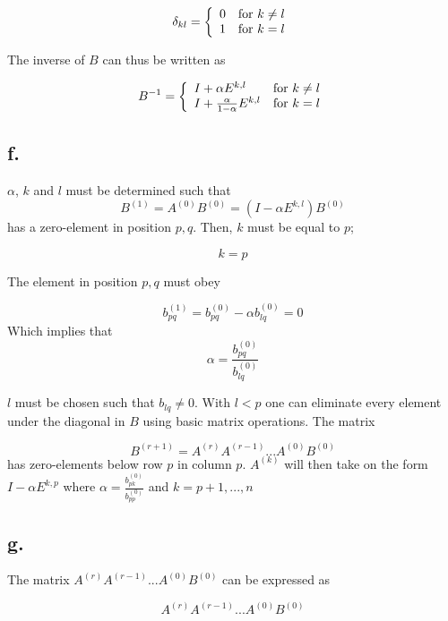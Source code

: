 \documentclass[00-main.tex]{subfiles}
\begin{document}
\begin{equation}
\delta_{kl}  = 
\left\{ \begin{array}{lll}
	0 & {\rm for} ~k \neq l \\
	1 & {\rm for} ~k = l   
\end{array} \right.
\end{equation}

The inverse of $B$ can thus be written as

\begin{equation}
B^{-1}  = 
\left\{ \begin{array}{lll}
	I + \alpha E^{k,l} & {\rm for} ~k \neq l \\
	I + \frac{\alpha}{1 - \alpha} E^{k,l} & {\rm for} ~k = l   
\end{array} \right.
\end{equation}

\subsection*{f.}
$\alpha$, $k$ and $l$ must be determined such that 
\begin{equation}
B^{(1)} = A^{(0)}B^{(0)} = (I - \alpha E^{k,l}) B^{(0)}
\end{equation}
has a zero-element in position $p,q$. Then, $k$ must be equal to $p$; 

\begin{equation}
k=p
\end{equation}

The element in position $p,q$ must obey

\begin{equation}
b^{(1)}_{pq} = b^{(0)}_{pq} - \alpha b^{(0)}_{lq} = 0
\end{equation}
Which implies that
\begin{equation}
\alpha = \frac{b^{(0)}_{pq}}{b^{(0)}_{lq}} %
\end{equation}

$l$ must be chosen such that $b_{lq} \neq 0$. With $l<p$ one can eliminate every element under the diagonal in $B$ using basic matrix operations. The matrix

\begin{equation}
B^{(r+1)} = A^{(r)}A^{(r-1)} ... A^{(0)}B^{(0)}
\end{equation}
has zero-elements below row $p$ in column $p$. $A^{(k)}$ will then take on the form $I - \alpha E^{k,p}$ where $\alpha = \frac{b^{(0)}_{pk}}{b^{(0)}_{pp}}$ and $k=p+1, ..., n$

\subsection{g.}
The matrix $A^{(r)}A^{(r-1)} ... A^{(0)}B^{(0)}$ can be expressed as

\begin{equation}
A^{(r)}A^{(r-1)} ... A^{(0)}B^{(0)}
\end{equation}


\end{document}

